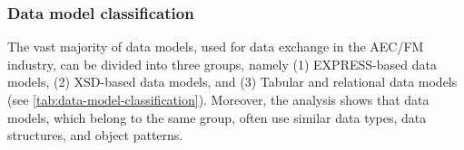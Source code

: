 \subsubsection{Data model classification}\label{sec:data-model-classification}



The vast majority of data models, used for data exchange in the AEC/FM industry, can be divided into three groups, namely (1) EXPRESS-based data models, (2) XSD-based data models, and (3) Tabular and relational data models (see \autoref{tab:data-model-classification}).
Moreover, the analysis shows that data models, which belong to the same group, often use similar data types, data structures, and object patterns.





